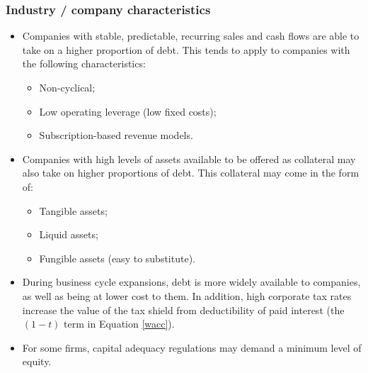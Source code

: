 \documentclass[../notes_compiled.tex]{subfiles}
\begin{document}
\subsubsection{Industry / company characteristics}
\begin{itemize}
\item Companies with stable, predictable, recurring sales and cash flows are able to take on a higher proportion of debt. This tends to apply to companies with the following characteristics:
\begin{itemize}
\item Non-cyclical;
\item Low operating leverage (low fixed costs);
\item Subscription-based revenue models.
\end{itemize}
\item Companies with high levels of assets available to be offered as collateral may also take on higher proportions of debt. This collateral may come in the form of:
\begin{itemize}
\item Tangible assets;
\item Liquid assets;
\item Fungible assets (easy to substitute).
\end{itemize}

\item During business cycle expansions, debt is more widely available to companies, as well as being at lower cost to them. In addition, high corporate tax rates increase the value of the tax shield from deductibility of paid interest (the $(1-t)$ term in Equation \ref{wacc}).
\item For some firms, capital adequacy regulations may demand a minimum level of equity.
\end{itemize}
\end{document}
